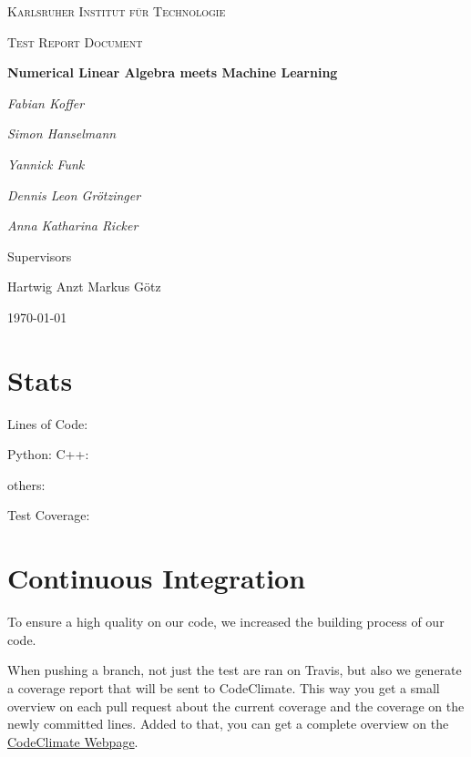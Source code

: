 \documentclass[parskip=full]{scrartcl}
\begin{document}
\begin{titlepage}
\centering
{\scshape\LARGE Karlsruher Institut für Technologie\par}
\vspace{1cm}
{\scshape\Large Test Report Document \par}
\vspace{1.5cm}
{\huge\bfseries Numerical Linear Algebra meets Machine Learning \par}
\vspace {2cm}

{\Large\itshape Fabian Koffer\par}
{\Large\itshape Simon Hanselmann\par}
{\Large\itshape Yannick Funk\par}
{\Large\itshape Dennis Leon Gr\"{o}tzinger\par}
{\Large\itshape Anna Katharina Ricker\par}

\vfill
Supervisors\par
Hartwig Anzt
Markus G\"{o}tz


\vfill
{\large\today\par}
\end{titlepage}

\tableofcontents
\newpage

\section{Stats}

Lines of Code:

Python:
C++:

others:

Test Coverage:	

\newpage

\section{Continuous Integration}

To ensure a high quality on our code, we increased the building process of our code.


When pushing a branch, not just the test are ran on Travis, but also we generate a coverage report that will be sent to CodeClimate.
This way you get a small overview on each pull request about the current coverage and the coverage on the newly committed lines.
Added to that, you can get a complete overview on the
\href{https://codeclimate.com/github/TheSlimvReal/PSE---LA-meets-ML}{CodeClimate Webpage}.
\end{document}
